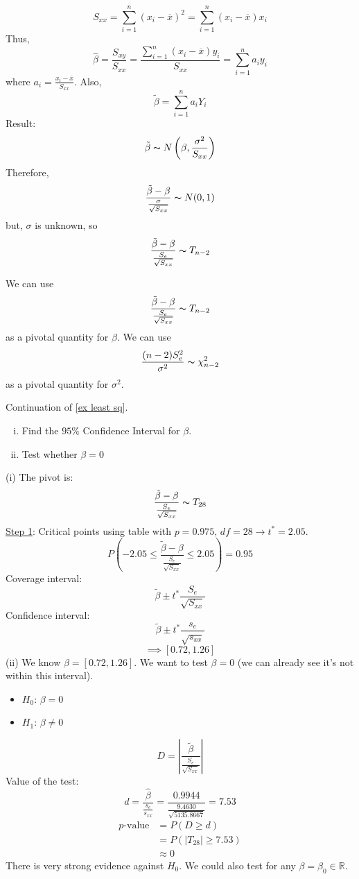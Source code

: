 \[ S_{xx}=\sum\limits_{i=1}^{n}(x_i-\overline{x})^2=\sum\limits_{i=1}^{n} (x_i-\overline{x})x_i \]
Thus,
\[ \hat{\beta}=\frac{S_{xy}}{S_{xx}}=\frac{\sum\limits_{i=1}^{n} (x_i-\overline{x})y_i}{S_{xx}}=\sum\limits_{i=1}^{n} a_iy_i  \]
where $ a_i=\frac{x_i-\overline{x}}{S_{xx}} $.
Also,
\[ \tilde{\beta}=\sum\limits_{i=1}^{n} a_iY_i \]
Result:
\[ \tilde{\beta} \thicksim N\left(\beta,\frac{\sigma^2}{S_{xx}}\right) \]
Therefore,
\[ \frac{\tilde{\beta}-\beta}{\frac{\sigma}{\sqrt{S_{xx}}}} \thicksim N(0,1) \]
but, $ \sigma $ is unknown, so
\[ \frac{\tilde{\beta}-\beta}{\frac{S_e}{\sqrt{S_{xx}}}} \thicksim T_{n-2}  \]
\begin{thmbox}
    \begin{theorem} We can use
        \[ \frac{\tilde{\beta}-\beta}{\frac{S_e}{\sqrt{S_{xx}}}} \thicksim T_{n-2} \]
        as a pivotal quantity for $ \beta $. We can use
        \[ \frac{(n-2)S_e^2}{\sigma^2} \thicksim \chi^2_{n-2} \]
        as a pivotal quantity for $ \sigma^2 $.
    \end{theorem}
\end{thmbox}
\begin{exbox}
    \begin{example} Continuation of \ref{ex least sq}.
        \begin{enumerate}[(i)]
            \item Find the $ 95\% $ Confidence Interval for $ \beta $.
            \item Test whether $ \beta=0 $
        \end{enumerate}
        (i) The pivot is:
        \[ \frac{\tilde{\beta}-\beta}{\frac{S_e}{\sqrt{S_{xx}}}} \thicksim T_{28} \]
        \underline{Step 1}: Critical points using table with $ p=0.975,\,df=28\rightarrow t^*=2.05 $.
        \[ P\left(-2.05\leqslant \frac{\tilde{\beta}-\beta}{\frac{S_e}{\sqrt{S_{xx}}}}\leqslant 2.05\right)=0.95\]
        Coverage interval:
        \[ \tilde{\beta}\pm t^* \frac{S_e}{\sqrt{S_{xx}}} \]
        Confidence interval:
        \[ \tilde{\beta}\pm t^* \frac{s_e}{\sqrt{s_{xx}}} \]
        \[ \implies [0.72,1.26] \]
        (ii) We know $ \beta=[0.72,1.26] $. We want to test $ \beta=0 $ (we can already see it's
        not within this interval).
        \begin{itemize}
            \item $ H_0 $: $ \beta=0 $
            \item $ H_1 $: $ \beta\neq 0 $
        \end{itemize}
        \[ D=\left|\frac{\tilde{\beta}}{\frac{S_e}{\sqrt{S_{xx}}}}\right| \]
        Value of the test:
        \[ d=\frac{\hat{\beta}}{\frac{s_e}{s_{xx}}}=\frac{0.9944}{\frac{9.4630}{\sqrt{5135.8667}}}=7.53 \]
        \begin{align*}
            p\text{-value}
             & =P(D\geqslant d)           \\
             & =P(|T_{28}|\geqslant 7.53) \\
             & \approx 0
        \end{align*}
        There is very strong evidence against $ H_0 $.
        We could also test for any $ \beta=\beta_0\in\mathbb{R} $.
    \end{example}
\end{exbox}
